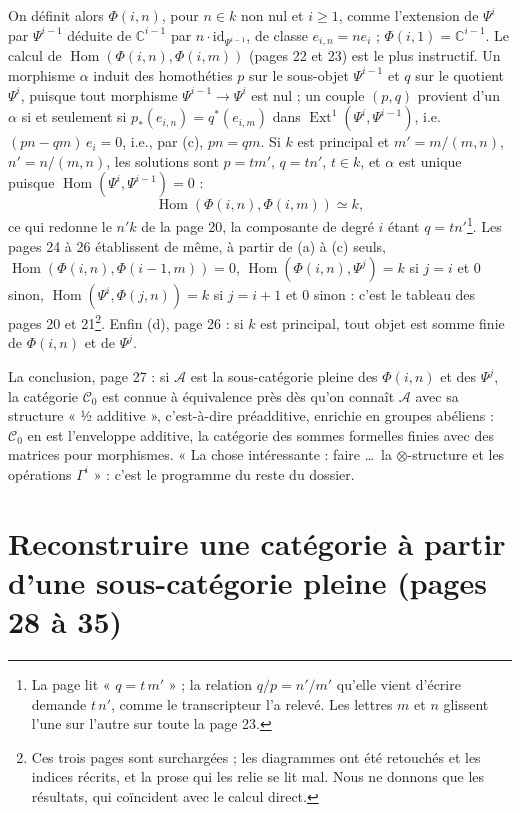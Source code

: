 \documentclass[11pt,a4paper]{article}
\begin{document}
On définit alors $\Phi(i,n)$, pour $n \in k$ non nul et $i \geqslant 1$,
comme l'extension de $\Psi^{i}$ par $\Psi^{i-1}$ déduite de
$\mathbb{C}^{i-1}$ par $n \cdot \mathrm{id}_{\Psi^{i-1}}$, de classe
$e_{i,n} = n e_{i}$ ; $\Phi(i,1) = \mathbb{C}^{i-1}$. Le calcul de
$\operatorname{Hom}(\Phi(i,n), \Phi(i,m))$ (pages 22 et 23) est le plus
instructif. Un morphisme $\alpha$ induit des homothéties $p$ sur le
sous-objet $\Psi^{i-1}$ et $q$ sur le quotient $\Psi^{i}$, puisque tout
morphisme $\Psi^{i-1} \to \Psi^{i}$ est nul ; un couple $(p, q)$ provient d'un
$\alpha$ si et seulement si $p_{*}(e_{i,n}) = q^{*}(e_{i,m})$ dans
$\operatorname{Ext}^{1}(\Psi^{i}, \Psi^{i-1})$, i.e. $(pn - qm)\, e_{i} = 0$,
i.e., par (c), $pn = qm$. Si $k$ est principal et $m' = m/(m,n)$,
$n' = n/(m,n)$, les solutions sont $p = t m'$, $q = t n'$, $t \in k$, et
$\alpha$ est unique puisque $\operatorname{Hom}(\Psi^{i}, \Psi^{i-1}) = 0$ :
\[
  \operatorname{Hom}(\Phi(i,n), \Phi(i,m)) \simeq k ,
\]
ce qui redonne le $n'k$ de la page 20, la composante de degré $i$ étant
$q = tn'$\footnote{La page lit « $q = t\,m'$ » ; la relation $q/p = n'/m'$
qu'elle vient d'écrire demande $t\,n'$, comme le transcripteur l'a relevé.
Les lettres $m$ et $n$ glissent l'une sur l'autre sur toute la page 23.}.
Les pages 24 à 26 établissent de même, à partir de (a) à (c) seuls,
$\operatorname{Hom}(\Phi(i,n), \Phi(i-1,m)) = 0$,
$\operatorname{Hom}(\Phi(i,n), \Psi^{j}) = k$ si $j = i$ et $0$ sinon,
$\operatorname{Hom}(\Psi^{i}, \Phi(j,n)) = k$ si $j = i+1$ et $0$ sinon :
c'est le tableau des pages 20 et 21\footnote{Ces trois pages sont surchargées ; les
diagrammes ont été retouchés et les indices récrits, et la prose qui les
relie se lit mal. Nous ne donnons que les résultats, qui coïncident avec le
calcul direct.}. Enfin (d), page 26 : si $k$ est principal, tout objet est
somme finie de $\Phi(i,n)$ et de $\Psi^{j}$.

La conclusion, page 27 : si $\mathcal{A}$ est la sous-catégorie pleine des
$\Phi(i,n)$ et des $\Psi^{j}$, la catégorie $\mathcal{C}_{0}$ est connue à
équivalence près dès qu'on connaît $\mathcal{A}$ avec sa structure
« ½ additive », c'est-à-dire préadditive, enrichie en groupes abéliens :
$\mathcal{C}_{0}$ en est l'enveloppe additive, la catégorie des sommes
formelles finies avec des matrices pour morphismes. « La chose intéressante :
faire \ldots\ la $\otimes$-structure et les opérations $\Gamma^{i}$ » : c'est
le programme du reste du dossier.

\section*{Reconstruire une catégorie à partir d'une sous-catégorie pleine (pages 28 à 35)}
\end{document}

